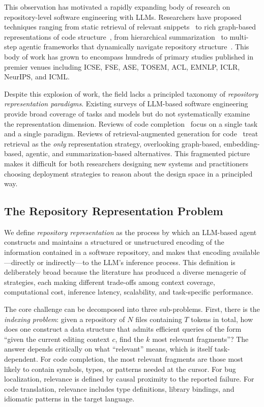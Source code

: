 This observation has motivated a rapidly expanding body of research on repository-level software
engineering with LLMs. Researchers have proposed techniques ranging from static retrieval of
relevant snippets~\cite{zhang2023repocoder, lu2022reacc} to rich graph-based representations
of code structure~\cite{guo2021graphcodebert, liu2024graphcoder}, from hierarchical
summarization~\cite{dhulshette2025hierarchical, makharev2025code} to multi-step agentic
frameworks that dynamically navigate repository structure~\cite{yang2024sweagent,
zhang2024autocoderover, jimenez2024swebench}. This body of work has grown to encompass hundreds
of primary studies published in premier venues including ICSE, FSE, ASE, TOSEM, ACL, EMNLP,
ICLR, NeurIPS, and ICML.

Despite this explosion of work, the field lacks a principled taxonomy of \emph{repository
representation paradigms}. Existing surveys of LLM-based software engineering~\cite{hou2024llmse,
zhang2026survey, jiang2026survey} provide broad coverage of tasks and models but do not
systematically examine the representation dimension. Reviews of code
completion~\cite{husein2025codecompletion} focus on a single task and a single paradigm.
Reviews of retrieval-augmented generation for code~\cite{tao2026ragsurvey} treat retrieval as
the \emph{only} representation strategy, overlooking graph-based, embedding-based, agentic, and
summarization-based alternatives. This fragmented picture makes it difficult for both
researchers designing new systems and practitioners choosing deployment strategies to reason
about the design space in a principled way.

\subsection{The Repository Representation Problem}

We define \emph{repository representation} as the process by which an LLM-based agent
constructs and maintains a structured or unstructured encoding of the information contained in
a software repository, and makes that encoding available---directly or indirectly---to the
LLM's inference process. This definition is deliberately broad because the literature has
produced a diverse menagerie of strategies, each making different trade-offs among context
coverage, computational cost, inference latency, scalability, and task-specific performance.

The core challenge can be decomposed into three sub-problems. First, there is the
\emph{indexing problem}: given a repository of $N$ files containing $T$ tokens in total, how
does one construct a data structure that admits efficient queries of the form ``given the
current editing context $c$, find the $k$ most relevant fragments''? The answer depends
critically on what ``relevant'' means, which is itself task-dependent. For code completion, the
most relevant fragments are those most likely to contain symbols, types, or patterns needed
at the cursor. For bug localization, relevance is defined by causal proximity to the reported
failure. For code translation, relevance includes type definitions, library bindings, and
idiomatic patterns in the target language.


